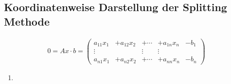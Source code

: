 \subsection{Koordinatenweise Darstellung der Splitting Methode}
\begin{align*}
	0 = Ax \cdot b = \begin{pmatrix}
	a_{11}x_1 &+ a_{12}x_2 &+ \cdots &+ a_{1n} x_n &- b_1\\
	\vdots & & \vdots & \vdots\\
	a_{n1}x_1 &+ a_{n2}x_2 &+ \cdots &+ a_{nn}x_n &-b_n
	\end{pmatrix}
\end{align*}
\begin{enumerate}
	\item 
\end{enumerate}